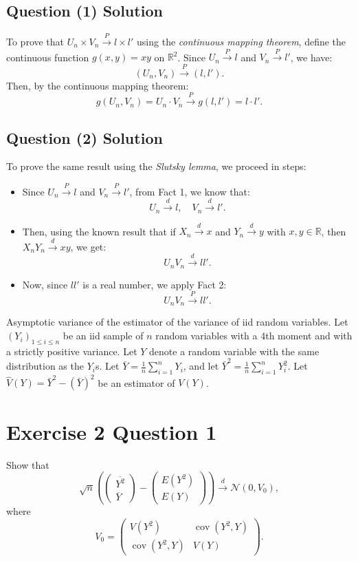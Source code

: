 \documentclass{article}
\begin{document}
\subsection{Question (1) Solution}
    To prove that $U_n \times V_n \xrightarrow{P} l \times l'$ using the \textit{continuous mapping theorem}, define the continuous function $g(x, y) = xy$ on $\mathbb{R}^2$. Since $U_n \xrightarrow{P} l$ and $V_n \xrightarrow{P} l'$, we have:
    \[
    (U_n, V_n) \xrightarrow{P} (l, l').
    \]
    Then, by the continuous mapping theorem:
    \[
    g(U_n, V_n) = U_n \cdot V_n \xrightarrow{P} g(l, l') = l \cdot l'.
    \]

\subsection{Question (2) Solution}
    To prove the same result using the \textit{Slutsky lemma}, we proceed in steps:
    \begin{itemize}
        \item Since $U_n \xrightarrow{P} l$ and $V_n \xrightarrow{P} l'$, from Fact 1, we know that:
        \[
        U_n \xrightarrow{d} l, \quad V_n \xrightarrow{d} l'.
        \]
        \item Then, using the known result that if $X_n \xrightarrow{d} x$ and $Y_n \xrightarrow{d} y$ with $x, y \in \mathbb{R}$, then $X_n Y_n \xrightarrow{d} xy$, we get:
        \[
        U_n V_n \xrightarrow{d} l l'.
        \]
        \item Now, since $l l'$ is a real number, we apply Fact 2:
        \[
        U_n V_n \xrightarrow{P} l l'.
        \]
    \end{itemize}

\newpage
Asymptotic variance of the estimator of the variance of iid random variables.
Let $(Y_i)_{1\leq i \leq n}$ be an iid sample of $n$ random variables with a 4th moment and with a strictly positive variance. Let $Y$ denote a random variable with the same distribution as the $Y_i$s. Let $\bar{Y} = \frac{1}{n} \sum^{n}_{i=1}Y_i$, and let $\bar{Y}^2 = \frac{1}{n} \sum^n_{i=1}Y^2_{i}$. Let $\hat{V}(Y) = \bar{Y}^2-(\bar{Y})^2$ be an estimator of $V(Y)$.

\section{Exercise 2 Question 1}Show that
\[
\sqrt{n} \left( 
\begin{pmatrix}
\overline{Y^2} \\
\overline{Y}
\end{pmatrix}
-
\begin{pmatrix}
E(Y^2) \\
E(Y)
\end{pmatrix}
\right)
\xrightarrow{d} \mathcal{N}(0, V_0),
\]
where
\[
V_0 = 
\begin{pmatrix}
V(Y^2) & \operatorname{cov}(Y^2, Y) \\
\operatorname{cov}(Y^2, Y) & V(Y)
\end{pmatrix}.
\]
\end{document}

